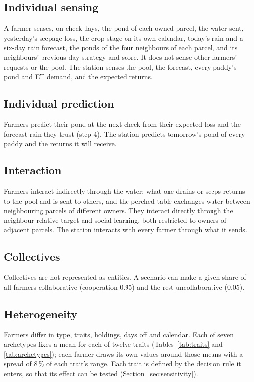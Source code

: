 \documentclass[11pt]{article}
\begin{document}
\subsection{Individual sensing}
A farmer senses, on check days, the pond of each owned parcel, the water sent, yesterday's seepage loss, the crop stage on its own calendar, today's rain and a six-day rain forecast, the ponds of the four neighbours of each parcel, and its neighbours' previous-day strategy and score. It does not sense other farmers' requests or the pool. The station senses the pool, the forecast, every paddy's pond and ET demand, and the expected returns.

\subsection{Individual prediction}
Farmers predict their pond at the next check from their expected loss and the forecast rain they trust (step 4). The station predicts tomorrow's pond of every paddy and the returns it will receive.

\subsection{Interaction}
Farmers interact indirectly through the water: what one drains or seeps returns to the pool and is sent to others, and the perched table exchanges water between neighbouring parcels of different owners. They interact directly through the neighbour-relative target and social learning, both restricted to owners of adjacent parcels. The station interacts with every farmer through what it sends.

\subsection{Collectives}
Collectives are not represented as entities. A scenario can make a given share of all farmers collaborative (cooperation 0.95) and the rest uncollaborative (0.05).

\subsection{Heterogeneity}
\label{sec:heterogeneity}
Farmers differ in type, traits, holdings, days off and calendar. Each of seven archetypes fixes a mean for each of twelve traits (Tables~\ref{tab:traits} and \ref{tab:archetypes}); each farmer draws its own values around those means with a spread of 8\,\% of each trait's range. Each trait is defined by the decision rule it enters, so that its effect can be tested (Section~\ref{sec:sensitivity}).
\end{document}

